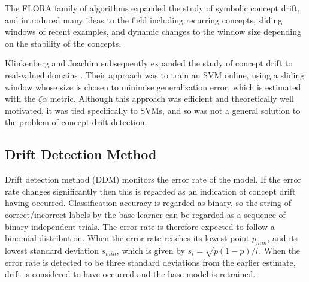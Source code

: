 The FLORA family of algorithms  \cite{FLORA} expanded the study of symbolic concept drift, and introduced many ideas to the field including recurring concepts, sliding windows of recent examples, and dynamic changes to the window size depending on the stability of the concepts. 

Klinkenberg and Joachim subsequently expanded the study of concept drift to real-valued domains \cite{SVM_detection}. Their approach was to train an SVM online, using a sliding window whose size is chosen to minimise generalisation error, which is estimated with the $\zeta\alpha$ metric. Although this approach was efficient and theoretically well motivated, it was tied specifically to SVMs, and so was not a general solution to the problem of concept drift detection.

\subsection{Drift Detection Method}

Drift detection method (DDM) monitors the error rate of the model. If the error rate changes significantly then this is regarded as an indication of concept drift having occurred. Classification accuracy is regarded as binary, so the string of correct/incorrect labels by the base learner can be regarded as a sequence of binary independent trials. The error rate is therefore expected to follow a binomial distribution. When the error rate reaches its lowest point $p_{min}$, and its lowest standard deviation $s_{min}$, which is given by $s_i = \sqrt{p(1-p)/i}$. When the error rate is detected to be three standard deviations from the earlier estimate, drift is considered to have occurred and the base model is retrained.

